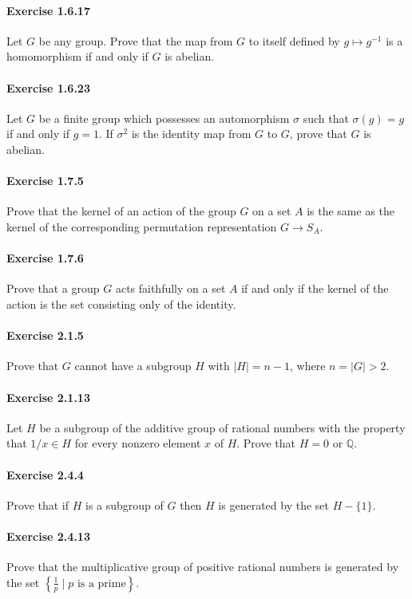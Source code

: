 \documentclass{article}
\begin{document}
\paragraph{Exercise 1.6.17} Let $G$ be any group. Prove that the map from $G$ to itself defined by $g \mapsto g^{-1}$ is a homomorphism if and only if $G$ is abelian.

\paragraph{Exercise 1.6.23} Let $G$ be a finite group which possesses an automorphism $\sigma$ such that $\sigma(g)=g$ if and only if $g=1$. If $\sigma^{2}$ is the identity map from $G$ to $G$, prove that $G$ is abelian.

\paragraph{Exercise 1.7.5} Prove that the kernel of an action of the group $G$ on a set $A$ is the same as the kernel of the corresponding permutation representation $G\to S_A$.

\paragraph{Exercise 1.7.6} Prove that a group $G$ acts faithfully on a set $A$ if and only if the kernel of the action is the set consisting only of the identity.

\paragraph{Exercise 2.1.5} Prove that $G$ cannot have a subgroup $H$ with $|H|=n-1$, where $n=|G|>2$.

\paragraph{Exercise 2.1.13} Let $H$ be a subgroup of the additive group of rational numbers with the property that $1 / x \in H$ for every nonzero element $x$ of $H$. Prove that $H=0$ or $\mathbb{Q}$.

\paragraph{Exercise 2.4.4} Prove that if $H$ is a subgroup of $G$ then $H$ is generated by the set $H-\{1\}$.

\paragraph{Exercise 2.4.13} Prove that the multiplicative group of positive rational numbers is generated by the set $\left\{\frac{1}{p} \mid \text{$p$ is a prime} \right\}$.
\end{document}
